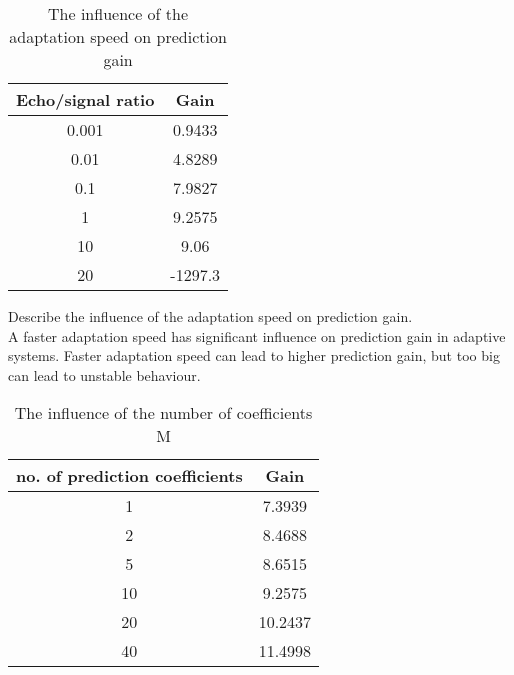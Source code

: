\documentclass{article}
\begin{document}
\begin{table}[ht!]
  \begin{center}
      \caption{The influence of the adaptation speed on prediction gain}
        \label{tab:task4tab}
        \begin{tabular}{c|c} 
        \textbf{Echo/signal ratio} & \textbf{Gain} \\ \hline
            0.001 & 0.9433 \\
            0.01 & 4.8289 \\
            0.1 & 7.9827 \\
            1 & 9.2575 \\
            10 & 9.06 \\
            20 & -1297.3 \\
    \end{tabular}
  \end{center}
\end{table}

Describe the influence of the adaptation speed on prediction gain. \\
A faster adaptation speed has significant influence on
prediction gain in adaptive systems. Faster adaptation speed
can lead to higher prediction gain, but too big can lead to
unstable behaviour.

\begin{table}[ht!]
  \begin{center}
      \caption{The influence of the number of coefficients M}
        \label{tab:task4tab}
        \begin{tabular}{c|c} 
        \textbf{no. of prediction coefficients} & \textbf{Gain} \\ \hline
            1 & 7.3939 \\
            2 & 8.4688 \\
            5 & 8.6515 \\
            10 & 9.2575 \\
            20 & 10.2437 \\
            40 & 11.4998 \\
    \end{tabular}
  \end{center}
\end{table}
\end{document}
